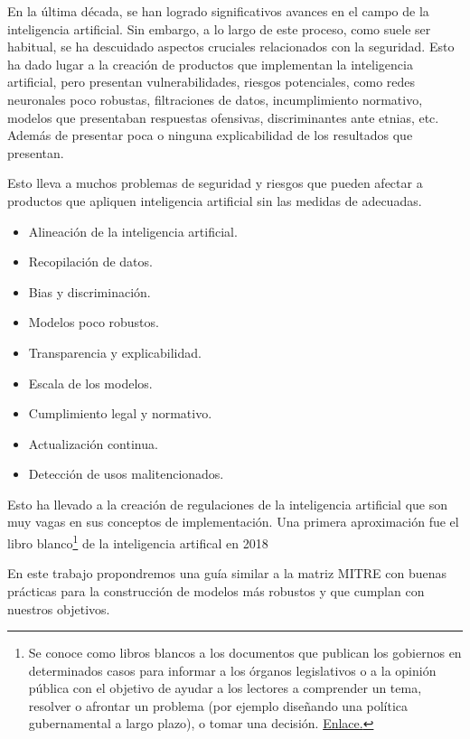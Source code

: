 En la última década, se han logrado significativos avances en el campo de la inteligencia artificial. Sin embargo, a lo largo de este proceso, como suele ser habitual, se ha descuidado  aspectos cruciales relacionados con la seguridad. Esto ha dado lugar a la creación de productos que implementan la inteligencia artificial, pero presentan vulnerabilidades, riesgos potenciales, como redes neuronales poco robustas, filtraciones de datos, incumplimiento normativo, modelos que presentaban respuestas ofensivas, discriminantes ante etnias, etc. Además de presentar poca o ninguna explicabilidad de los resultados que presentan.

Esto lleva a muchos problemas de seguridad y riesgos que pueden afectar a productos que apliquen inteligencia artificial sin las medidas de adecuadas.

\begin{itemize}
    \item Alineación de la inteligencia artificial.
    \item Recopilación de datos.
    \item Bias y discriminación.
    \item Modelos poco robustos.
    \item Transparencia y explicabilidad.
    \item Escala de los modelos.
    \item Cumplimiento legal y normativo.
    \item Actualización continua.
    \item Detección de usos malitencionados.
\end{itemize}

Esto ha llevado a la creación de regulaciones de la inteligencia artificial que son muy vagas en sus conceptos de implementación. Una primera aproximación fue el libro blanco\footnote{Se conoce como libros blancos a los documentos que publican los gobiernos en determinados casos para informar a los órganos legislativos o a la opinión pública con el objetivo de ayudar a los lectores a comprender un tema, resolver o afrontar un problema (por ejemplo diseñando una política gubernamental a largo plazo), o tomar una decisión. \href{https://es.wikipedia.org/wiki/Libro_blanco}{Enlace.}} de la inteligencia artifical en 2018 \cite{whitebook2020AI}


En este trabajo propondremos una guía similar a la matriz \gls{MITRE} con buenas prácticas para la construcción de modelos más robustos y que cumplan con nuestros objetivos.

